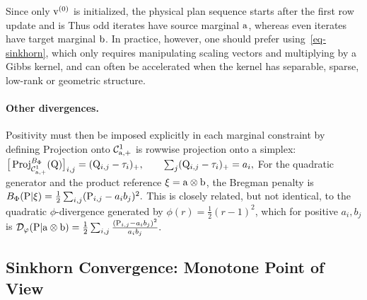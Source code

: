 Since only $\vD^{(0)}$ is initialized, the physical plan sequence starts after the first row update and is
Thus odd iterates have source marginal $\a$, whereas even iterates have target marginal $\b$. In practice, however, one should prefer using~\eqref{eq-sinkhorn}, which only requires manipulating scaling vectors and multiplying by a Gibbs kernel, and can often be accelerated when the kernel has separable, sparse, low-rank or geometric structure.

\paragraph{Other divergences.}
Positivity must then be imposed explicitly in each marginal constraint by defining
Projection onto $\Cc^1_{\a,+}$ is rowwise projection onto a simplex: \(\big[\Proj_{\Cc^1_{\a,+}}^{B_\Phi}(\Q)\big]_{i,j} = (\Q_{i,j}-\tau_i)_+, \qquad \sum_j(\Q_{i,j}-\tau_i)_+=a_i,\)
For the quadratic generator and the product reference $\xi=\a\otimes\b$, the Bregman penalty is \(B_\Phi(\P|\xi) = \frac12\sum_{i,j}(\P_{i,j}-a_i b_j)^2.\)
This is closely related, but not identical, to the quadratic $\phi$-divergence generated by $\phi(r)=\frac12(r-1)^2$, which for positive $a_i,b_j$ is
\(\Divergm_\phi(\P|\a\otimes\b) = \frac12\sum_{i,j}\frac{(\P_{i,j}-a_i b_j)^2}{a_i b_j}.\)
\subsection{Sinkhorn Convergence: Monotone Point of View}\label{sec-sinkhorn-monotone}
